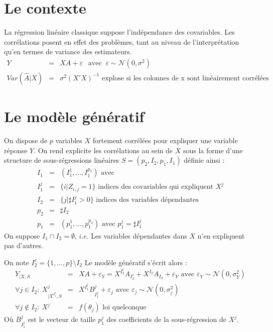 \documentclass[12pt]{article}
\begin{document}

\section{Le contexte}
	La régression linéaire classique suppose l'indépendance des covariables. Les corrélations posent en effet des problèmes, tant au niveau de l'interprétation qu'en termes de variance des estimateurs.
	\begin{eqnarray}
		Y&=&XA+\varepsilon \ \ \textrm{ avec } \ \varepsilon\sim \mathcal{N}(0,\sigma^2) \\
		Var(\hat{A}|X)&=& \sigma^2(X'X)^{-1} \textrm{ explose si les colonnes de x sont linéairement corrélées}
	\end{eqnarray}
			
	
	
\section{Le modèle génératif}
On dispose de $p$ variables $X$ fortement corrélées pour expliquer une variable réponse $Y$.
On rend explicite les corrélations au sein de $X$ sous la forme d'une structure de sous-régressions linéaires $S=(p_2,I_2,p_1,I_1)$ définie ainsi :
	\begin{eqnarray}
		I_1&=&(I_1^1,\dots,I_1^{p_2}) \textrm{ avec}		\\
		I_1^j &=& \{i |Z_{i,j}=1 \} \textrm{ indices des covariables qui expliquent $X^j$} \\
		I_2&=&\{j |\sharp I_1^j>0 \}  \textrm{ indices des variables dépendantes} \\
		p_2&=& \sharp I_2 \\
		p_1&=&(p_1^1,\dots,p_1^{p_2}) \textrm{ avec }p_1^j=\sharp I_1^j 
	\end{eqnarray}
	On suppose $I_1\cap I_2=\emptyset$, $i.e.$ Les variables dépendantes dans $X$ n'en expliquent pas d'autres. 
	
	On note $I_2^c=\{1,\dots,p\}\setminus I_2$
Le modèle génératif s'écrit alors :
\begin{eqnarray}
	Y_{|X,S}&=&XA+\varepsilon_Y= X^{I_2^c}A_{I_2^c}+X^{I_2}A_{I_2}+\varepsilon_Y \textrm{ avec } \varepsilon_Y \sim \mathcal{N}(0,\sigma_Y^2) \label{MainR}\\
	\forall j \in I_2 : \  X^j_{|X^{I_1^j},S}&=&X^{I_1^j}B_{I_1^j}^j + \varepsilon_{j} \textrm{ avec } \varepsilon_j \sim \mathcal{N}(0,\sigma_j^2) \label{SR}\\
    \forall j \notin I_2 : \ X^j &=& f(\theta_j) \textrm{ loi quelconque}	
\end{eqnarray}
Où $B_{I_1^j}^j$ est le vecteur de taille $p_1^j$ des coefficients de la sous-régression de $X^j$.
\end{document}
